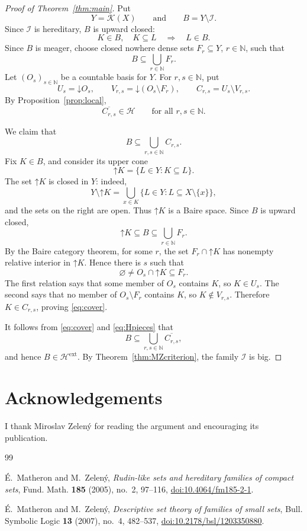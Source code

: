 \documentclass[11pt]{amsart}
\theoremstyle{remark}
\newcommand{\K}{\mathcal K}
\newcommand{\HH}{\mathcal H}
\newcommand{\I}{\mathcal I}
\newcommand{\cl}[1]{\overline{#1}}
\newcommand{\down}[1]{\mathord{\downarrow}\!#1}
\newcommand{\up}[1]{\mathord{\uparrow}\!#1}
\begin{document}
\begin{proof}[Proof of Theorem~\ref{thm:main}]
Put
\[
Y=\K(X)
\qquad\text{and}\qquad
B=Y\setminus\I.
\]
Since $\I$ is hereditary, $B$ is upward closed:
\[
K\in B,\quad K\subseteq L
\quad\Longrightarrow\quad
L\in B.
\]
Since $B$ is meager, choose closed nowhere dense sets
$F_r\subseteq Y$, $r\in\mathbb N$, such that
\[
B\subseteq\bigcup_{r\in\mathbb N}F_r.
\]
Let $(O_s)_{s\in\mathbb N}$ be a countable basis for $Y$. For
$r,s\in\mathbb N$, put
\[
U_s=\down O_s,\qquad
V_{r,s}=\down(O_s\setminus F_r),\qquad
C_{r,s}=U_s\setminus V_{r,s}.
\]
By Proposition~\ref{prop:local},
\begin{equation}\label{eq:Hpieces}
\cl{C_{r,s}}\in\HH
\qquad\text{for all }r,s\in\mathbb N.
\end{equation}

We claim that
\begin{equation}\label{eq:cover}
B\subseteq\bigcup_{r,s\in\mathbb N}C_{r,s}.
\end{equation}
Fix $K\in B$, and consider its upper cone
\[
\up K=\{L\in Y:K\subseteq L\}.
\]
The set $\up K$ is closed in $Y$: indeed,
\[
Y\setminus\up K
=
\bigcup_{x\in K}
\{L\in Y:L\subseteq X\setminus\{x\}\},
\]
and the sets on the right are open. Thus $\up K$ is a Baire space.
Since $B$ is upward closed,
\[
\up K\subseteq B\subseteq\bigcup_{r\in\mathbb N}F_r.
\]
By the Baire category theorem, for some $r$, the set
$F_r\cap\up K$ has nonempty relative interior in $\up K$. Hence there
is $s$ such that
\[
\varnothing\neq O_s\cap\up K\subseteq F_r.
\]
The first relation says that some member of $O_s$ contains $K$, so
$K\in U_s$. The second says that no member of
$O_s\setminus F_r$ contains $K$, so $K\notin V_{r,s}$. Therefore
$K\in C_{r,s}$, proving \eqref{eq:cover}.

It follows from \eqref{eq:cover} and \eqref{eq:Hpieces} that
\[
B\subseteq
\bigcup_{r,s\in\mathbb N}\cl{C_{r,s}},
\]
and hence $B\in\HH^{\mathrm{ext}}$. By
Theorem~\ref{thm:MZcriterion}, the family $\I$ is big.
\end{proof}


\section*{Acknowledgements}

I thank Miroslav Zelený for reading the argument and
encouraging its publication.

\begin{thebibliography}{99}

É.~Matheron and M.~Zelený,
\emph{Rudin-like sets and hereditary families of compact sets},
Fund. Math. \textbf{185} (2005), no.~2, 97--116,
\href{https://doi.org/10.4064/fm185-2-1}{doi:10.4064/fm185-2-1}.

É.~Matheron and M.~Zelený,
\emph{Descriptive set theory of families of small sets},
Bull. Symbolic Logic \textbf{13} (2007), no.~4, 482--537,
\href{https://doi.org/10.2178/bsl/1203350880}{doi:10.2178/bsl/1203350880}.

\end{thebibliography}
\end{document}
